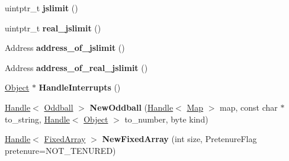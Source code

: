 \begin{DoxyCompactItemize}
\item 
\hypertarget{classv8_1_1internal_1_1_v8___f_i_n_a_l_afc9372f592a0204191f85c3582f61561}{}uintptr\+\_\+t {\bfseries jslimit} ()\label{classv8_1_1internal_1_1_v8___f_i_n_a_l_afc9372f592a0204191f85c3582f61561}

\item 
\hypertarget{classv8_1_1internal_1_1_v8___f_i_n_a_l_a9573b4eb8a892764a3de3d60bc2eeb94}{}uintptr\+\_\+t {\bfseries real\+\_\+jslimit} ()\label{classv8_1_1internal_1_1_v8___f_i_n_a_l_a9573b4eb8a892764a3de3d60bc2eeb94}

\item 
\hypertarget{classv8_1_1internal_1_1_v8___f_i_n_a_l_adb5b7573736c5fc7f8029c4de69bc48c}{}Address {\bfseries address\+\_\+of\+\_\+jslimit} ()\label{classv8_1_1internal_1_1_v8___f_i_n_a_l_adb5b7573736c5fc7f8029c4de69bc48c}

\item 
\hypertarget{classv8_1_1internal_1_1_v8___f_i_n_a_l_aa19de489e5c06d0cf0e2b3aabdc3271f}{}Address {\bfseries address\+\_\+of\+\_\+real\+\_\+jslimit} ()\label{classv8_1_1internal_1_1_v8___f_i_n_a_l_aa19de489e5c06d0cf0e2b3aabdc3271f}

\item 
\hypertarget{classv8_1_1internal_1_1_v8___f_i_n_a_l_a64384a34b07a968ad6bedb951bec35ad}{}\hyperlink{classv8_1_1internal_1_1_object}{Object} $\ast$ {\bfseries Handle\+Interrupts} ()\label{classv8_1_1internal_1_1_v8___f_i_n_a_l_a64384a34b07a968ad6bedb951bec35ad}

\item 
\hypertarget{classv8_1_1internal_1_1_v8___f_i_n_a_l_a3a9c1bcb7dab6e882a4a78cb720b91c8}{}\hyperlink{classv8_1_1internal_1_1_handle}{Handle}$<$ \hyperlink{classv8_1_1internal_1_1_oddball}{Oddball} $>$ {\bfseries New\+Oddball} (\hyperlink{classv8_1_1internal_1_1_handle}{Handle}$<$ \hyperlink{classv8_1_1internal_1_1_map}{Map} $>$ map, const char $\ast$to\+\_\+string, \hyperlink{classv8_1_1internal_1_1_handle}{Handle}$<$ \hyperlink{classv8_1_1internal_1_1_object}{Object} $>$ to\+\_\+number, byte kind)\label{classv8_1_1internal_1_1_v8___f_i_n_a_l_a3a9c1bcb7dab6e882a4a78cb720b91c8}

\item 
\hypertarget{classv8_1_1internal_1_1_v8___f_i_n_a_l_afdd5b6a491028d06b389f460ffde26d8}{}\hyperlink{classv8_1_1internal_1_1_handle}{Handle}$<$ \hyperlink{classv8_1_1internal_1_1_fixed_array}{Fixed\+Array} $>$ {\bfseries New\+Fixed\+Array} (int size, Pretenure\+Flag pretenure=N\+O\+T\+\_\+\+T\+E\+N\+U\+R\+E\+D)\label{classv8_1_1internal_1_1_v8___f_i_n_a_l_afdd5b6a491028d06b389f460ffde26d8}


\end{DoxyCompactItemize}
